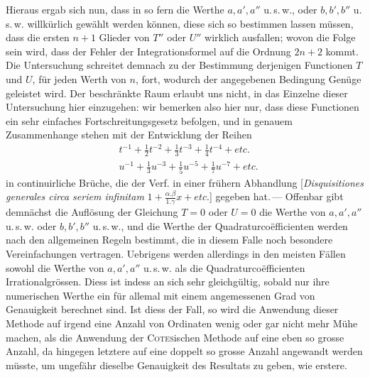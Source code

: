 Hieraus ergab sich nun, dass in so fern die Werthe \(a,a',a''\) u.\,s.\,w., oder
\(b,b',b''\) u.\,s.\,w. willkürlich gewählt werden können, diese sich so bestimmen lassen
müssen, dass die ersten \(n+1\) Glieder von \(T''\) oder \(U''\) wirklich ausfallen;
wovon die Folge sein wird, dass der Fehler der Integrationsformel auf die Ordnung
\(2n+2\) kommt. Die Untersuchung schreitet demnach zu der Bestimmung
derjenigen Functionen \(T\) und \(U\), für jeden Werth von \(n\), fort, wodurch der
angegebenen Bedingung Genüge geleistet wird. Der beschränkte Raum erlaubt
uns nicht, in das Einzelne dieser Untersuchung hier einzugehen: wir bemerken
also hier nur, dass diese Functionen ein sehr einfaches Fortschreitungsgesetz
befolgen, und in genauem Zusammenhange stehen mit der Entwicklung der Reihen
\[
\begin{aligned}
&t^{-1}+\tfrac{1}{2}t^{-2}+\tfrac{1}{3}t^{-3}+\tfrac{1}{4}t^{-4}+\mathit{etc.}\\
&u^{-1}+\tfrac{1}{3}u^{-3}+\tfrac{1}{5}u^{-5}+\tfrac{1}{7}u^{-7}+\mathit{etc.}
\end{aligned}
\]
in continuirliche Brüche, die der Verf. in einer frühern Abhandlung
[\textit{Disquisitiones generales circa seriem infinitam}
\(1+\frac{\alpha.\beta}{1.\gamma}x+\mathit{etc.}\)] gegeben hat.\,---
Offenbar gibt demnächst die Auflösung der Gleichung \(T=0\) oder \(U=0\)
die Werthe von \(a,a',a''\) u.\,s.\,w. oder \(b,b',b''\) u.\,s.\,w.,
und die Werthe der Quadraturcoëfficienten werden nach den allgemeinen Regeln
bestimmt, die in diesem Falle noch besondere Vereinfachungen vertragen.
Uebrigens werden allerdings in den meisten Fällen sowohl die Werthe von
\(a,a',a''\) u.\,s.\,w. als die Quadraturcoëfficienten Irrationalgrössen.
Diess ist indess an sich sehr gleichgültig, sobald nur ihre numerischen
Werthe ein für allemal mit einem angemessenen Grad von Genauigkeit berechnet
sind. Ist diess der Fall, so wird die Anwendung dieser Methode auf irgend
eine Anzahl von Ordinaten wenig oder gar nicht mehr Mühe machen, als die
Anwendung der \textsc{Cotes}ischen Methode auf eine eben so grosse Anzahl,
da hingegen letztere auf eine doppelt so grosse Anzahl angewandt werden
müsste, um ungefähr dieselbe Genauigkeit des Resultats zu geben, wie erstere.

